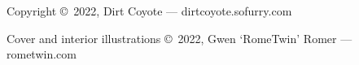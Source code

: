 \singlespacing
\thispagestyle{empty}
\null
\vfill
{\parindent0pt


\vspace{1ex}

\textsc{\FullTitle}

\vspace{1ex}

Copyright \copyright\ 2022, Dirt Coyote --- dirtcoyote.sofurry.com

\vspace{1ex}

Cover and interior illustrations \copyright\ 2022, Gwen `RomeTwin' Romer --- rometwin.com

}%

\clearpage
